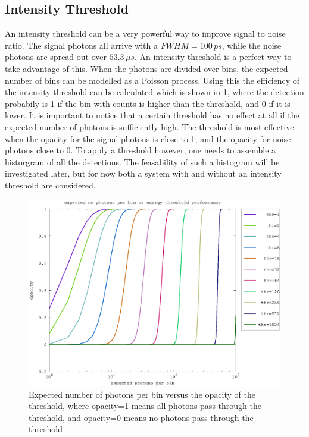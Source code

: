 \subsection{Intensity Threshold}\label{sssec:energy_threshold}
An intensity threshold can be a very powerful way to improve signal to noise ratio. The signal photons all arrive with a $FWHM = 100\,ps$, while the noise photons are spread out over $53.3\,\mu s$. An intensity threshold is a perfect way to take advantage of this. When the photons are divided over bins, the expected number of bins can be modelled as a Poisson process. Using this the efficiency of the intensity threshold can be calculated which is shown in \cref{fig:threshold_efficiency}, where the detection probabily is 1 if the bin with counts is higher than the threshold, and 0 if it is lower. It is important to notice that a certain threshold has no effect at all if the expected number of photons is sufficiently high. The threshold is most effective when the opacity for the signal photons is close to 1, and the opacity for noise photons close to 0. To apply a threshold however, one needs to assemble a historgram of all the detections. The feasability of such a histogram will be investigated later, but for now both a system with and without an intensity threshold are considered.  

\begin{figure}[H]
\centering
	\includegraphics[width=0.8\linewidth]{fig/threshold_efficiency.eps}
\caption{Expected number of photons per bin versus the opacity of the threshold, where opacity=1 means all photons pass through the threshold, and opacity=0 means no photons pass through the threshold}
\label{fig:threshold_efficiency}
\end{figure}


